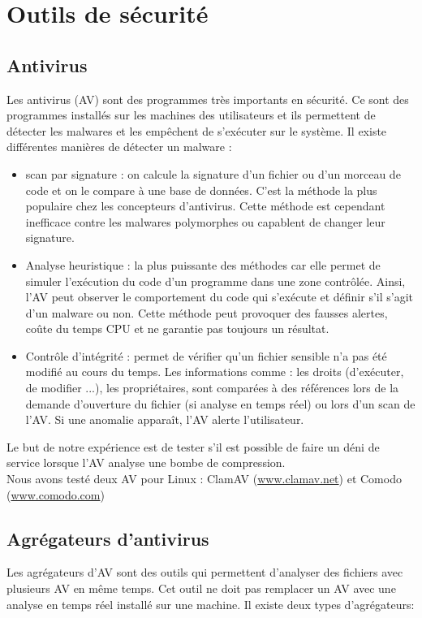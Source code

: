 \documentclass{svjour3}
\begin{document}
\section{Outils de sécurité}
\label{2.Outils}

\subsection{Antivirus}
\label{2.1antivirus}
Les antivirus (AV) sont des programmes très importants en sécurité. Ce sont des programmes installés sur les machines des utilisateurs et ils permettent de détecter les malwares et les empêchent de s’exécuter sur le système. Il existe différentes manières de détecter un malware : 
\begin{itemize}
\item scan par signature : on calcule la signature d'un fichier ou d'un morceau de code et on le compare à une base de données. C'est la méthode la plus populaire chez les concepteurs d'antivirus. Cette méthode est cependant inefficace contre les malwares polymorphes ou capablent de changer leur signature.
\item Analyse heuristique : la plus puissante des méthodes car elle permet de simuler l’exécution du code d'un programme dans une zone contrôlée. Ainsi, l'AV peut observer le comportement du code qui s’exécute et définir s'il s'agit d'un malware ou non. Cette méthode peut provoquer des fausses alertes, coûte du temps CPU et ne garantie pas toujours un résultat.
\item Contrôle d'intégrité : permet de vérifier qu'un fichier sensible n'a pas été modifié au cours du temps. Les informations comme : les droits (d'exécuter, de modifier ...), les propriétaires, sont comparées à des références lors de la demande d'ouverture du fichier (si analyse en temps réel) ou lors d'un scan de l'AV. Si une anomalie apparaît, l'AV alerte l'utilisateur.\\
\end{itemize}
Le but de notre expérience est de tester s'il est possible de faire un déni de service lorsque l'AV analyse une bombe de compression.\\
Nous avons testé deux AV pour Linux : ClamAV (\url{www.clamav.net}) et Comodo (\url{www.comodo.com})\\

\subsection{Agrégateurs d'antivirus}
\label{2.2agrégateurs}
Les agrégateurs d'AV sont des outils qui permettent d'analyser des fichiers avec plusieurs AV en même temps. Cet outil ne doit pas remplacer un AV avec une analyse en temps réel installé sur une machine. Il existe deux types d’agrégateurs:  
\end{document}
